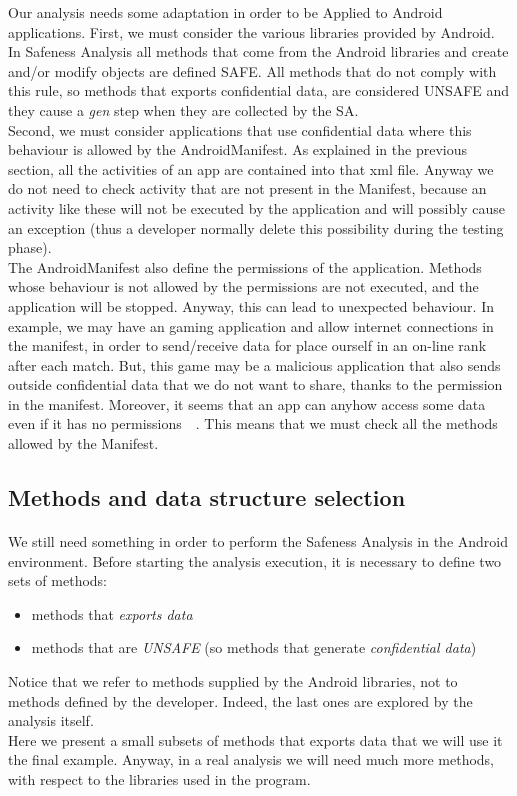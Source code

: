 \documentclass[letterpaper,twocolumn,10pt]{article}
\begin{document}
Our analysis needs some adaptation in order to be Applied to Android applications. First, we must consider the various libraries provided by Android. In Safeness Analysis all methods that come from the Android libraries and create and/or modify objects are defined SAFE. All methods that do not comply with this rule, so methods that exports confidential data, are considered UNSAFE and they cause a \emph{gen} step when they are collected by the SA.\\
Second, we must consider applications that use confidential data where this behaviour is allowed by the AndroidManifest. As explained in the previous section, all the activities of an app are contained into that xml file. Anyway we do not need to check activity that are not present in the Manifest, because an activity like these will not be executed by the application and will possibly cause an exception (thus a developer normally delete this possibility during the testing phase).\\
The AndroidManifest also define the permissions of the application. Methods whose behaviour is not allowed by the permissions are not executed, and the application will be stopped. Anyway, this can lead to unexpected behaviour. In example, we may have an gaming application and allow internet connections in the manifest, in order to send/receive data for place ourself in an on-line rank after each match. But, this game may be a malicious application that also sends outside confidential data that we do not want to share, thanks to the permission in the manifest. Moreover, it seems that an app can anyhow access some data even if it has no permissions~\cite{website:majorvuln}~\cite{website:zeroperm}. This means that we must check all the methods allowed by the Manifest.

\subsection{Methods and data structure selection}
\paragraph{}
We still need something in order to perform the Safeness Analysis in the Android environment. Before starting the analysis execution, it is necessary to define two sets of methods:
\begin{itemize}
\item methods that \emph{exports data}
\item methods that are \emph{UNSAFE} (so methods that generate \emph{confidential data})
\end{itemize}
Notice that we refer to methods supplied by the Android libraries, not to methods defined by the developer. Indeed, the last ones are explored by the analysis itself.\\
Here we present a small subsets of methods that exports data that we will use it the final example. Anyway, in a real analysis we will need much more methods, with respect to the libraries used in the program.\\
\end{document}
